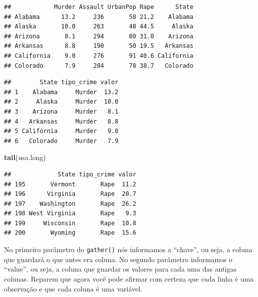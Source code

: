 \documentclass[]{book}
\newenvironment{Shaded}{\begin{snugshade}}{\end{snugshade}}
\newcommand{\KeywordTok}[1]{\textcolor[rgb]{0.13,0.29,0.53}{\textbf{#1}}}
\newcommand{\DataTypeTok}[1]{\textcolor[rgb]{0.13,0.29,0.53}{#1}}
\newcommand{\StringTok}[1]{\textcolor[rgb]{0.31,0.60,0.02}{#1}}
\newcommand{\OperatorTok}[1]{\textcolor[rgb]{0.81,0.36,0.00}{\textbf{#1}}}
\newcommand{\NormalTok}[1]{#1}
\begin{document}
\begin{verbatim}
##            Murder Assault UrbanPop Rape      State
## Alabama      13.2     236       58 21.2    Alabama
## Alaska       10.0     263       48 44.5     Alaska
## Arizona       8.1     294       80 31.0    Arizona
## Arkansas      8.8     190       50 19.5   Arkansas
## California    9.0     276       91 40.6 California
## Colorado      7.9     204       78 38.7   Colorado
\end{verbatim}

\begin{Shaded}
\end{Shaded}

\begin{verbatim}
##        State tipo_crime valor
## 1    Alabama     Murder  13.2
## 2     Alaska     Murder  10.0
## 3    Arizona     Murder   8.1
## 4   Arkansas     Murder   8.8
## 5 California     Murder   9.0
## 6   Colorado     Murder   7.9
\end{verbatim}

\begin{Shaded}
\begin{Highlighting}[]
\KeywordTok{tail}\NormalTok{(usa.long)}
\end{Highlighting}
\end{Shaded}

\begin{verbatim}
##             State tipo_crime valor
## 195       Vermont       Rape  11.2
## 196      Virginia       Rape  20.7
## 197    Washington       Rape  26.2
## 198 West Virginia       Rape   9.3
## 199     Wisconsin       Rape  10.8
## 200       Wyoming       Rape  15.6
\end{verbatim}

No primeiro parâmetro do \texttt{gather()} nós informamos a ``chave'',
ou seja, a coluna que guardará o que antes era coluna. No segundo
parâmetro informamos o ``value'', ou seja, a coluna que guardar os
valores para cada uma das antigas colunas. Reparem que agora você pode
afirmar com certeza que cada linha é uma observação e que cada coluna é
uma variável.
\end{document}
